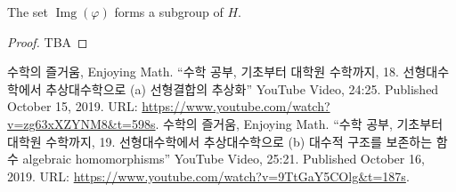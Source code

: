 \documentclass[11pt,openany]{article}
\begin{document}
\begin{remark*}
	The set \(\operatorname{Img}(\varphi)\) forms a subgroup of \(H\).
	\begin{proof}
		TBA
	\end{proof}
\end{remark*}


\vfill
\begin{thebibliography}{9}
	수학의 즐거움, Enjoying Math. ``수학 공부, 기초부터 대학원 수학까지, 18. 선형대수학에서 추상대수학으로 (a) 선형결합의 추상화'' YouTube Video, 24:25. Published 
	October 15, 2019. URL: \url{https://www.youtube.com/watch?v=zg63xXZYNM8&t=598s}.
	수학의 즐거움, Enjoying Math. ``수학 공부, 기초부터 대학원 수학까지, 19. 선형대수학에서 추상대수학으로 (b) 대수적 구조를 보존하는 함수 algebraic homomorphisms'' YouTube Video, 25:21. Published 
	October 16, 2019. URL: \url{https://www.youtube.com/watch?v=9TtGaY5COlg&t=187s}.
\end{thebibliography}
\end{document}
